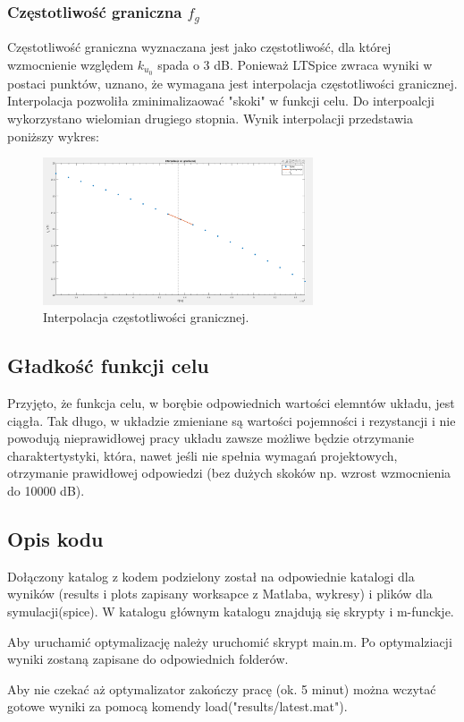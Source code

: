 \documentclass{article}
\begin{document}
\subsubsection*{Częstotliwość graniczna $f_g$}
Częstotliwość graniczna wyznaczana jest jako częstotliwość, dla której wzmocnienie względem $k_{u{_0}}$ spada o 3 dB.
Ponieważ LTSpice zwraca wyniki w postaci punktów, uznano, że wymagana jest interpolacja częstotliwości granicznej. Interpolacja pozwoliła zminimalizaować "skoki" w funkcji celu. Do interpoalcji wykorzystano wielomian drugiego stopnia. Wynik interpolacji przedstawia poniższy wykres:
\begin{figure}[h]
	\includegraphics[width=8cm]{graphics/fg_interp.png}
	\centering
	\caption{Interpolacja częstotliwości granicznej.}
\end{figure}




\subsection{Gładkość funkcji celu}
Przyjęto, że funkcja celu, w borębie odpowiednich wartości elemntów układu, jest ciągła. Tak długo, w układzie zmieniane są wartości pojemności i rezystancji i
nie powodują nieprawidłowej pracy układu zawsze możliwe będzie otrzymanie charaktertystyki, która, nawet jeśli nie spełnia wymagań projektowych, otrzymanie prawidłowej odpowiedzi (bez dużych skoków
np. wzrost wzmocnienia do 10000 dB).
\subsection{Opis kodu}
Dołączony katalog z kodem podzielony został na odpowiednie katalogi dla wyników (results i plots zapisany worksapce z Matlaba, wykresy) i plików dla symulacji(spice).
W katalogu głównym katalogu znajdują się skrypty i m-funckje. 

Aby uruchamić optymalizację należy uruchomić skrypt main.m. Po optymalziacji wyniki zostaną zapisane do odpowiednich folderów.

Aby nie czekać aż optymalizator zakończy pracę (ok. 5 minut) można wczytać gotowe wyniki za pomocą komendy load("results/latest.mat").
\end{document}
